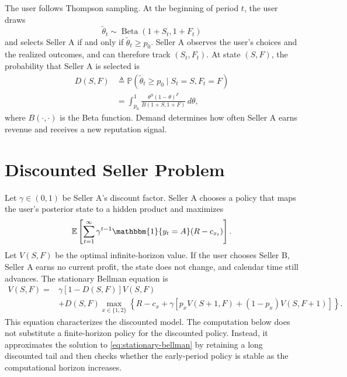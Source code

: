 \documentclass[opre]{informs3}
\newcommand{\E}{\mathbb{E}}
\newcommand{\Pb}{\mathbb{P}}
\newcommand{\Ind}[1]{\mathbbm{1}\{#1\}}
\begin{document}
The user follows Thompson sampling. At the beginning of period $t$, the user
draws
\begin{equation}
    \widetilde{\theta}_t
    \sim
    \operatorname{Beta}(1+S_t,1+F_t)
\end{equation}
and selects Seller A if and only if
$\widetilde{\theta}_t\geq p_0$. Seller A observes the user's choices and the
realized outcomes, and can therefore track $(S_t,F_t)$. At state $(S,F)$, the
probability that Seller A is selected is
\begin{equation}
\begin{aligned}
    D(S,F)
    &\triangleq
    \Pb(\widetilde{\theta}_t\geq p_0\mid S_t=S,F_t=F)\\
    &=
    \int_{p_0}^{1}
    \frac{\theta^S(1-\theta)^F}{B(1+S,1+F)}\,d\theta,
\end{aligned}
\label{eq:demand-probability}
\end{equation}
where $B(\cdot,\cdot)$ is the Beta function. Demand determines how often
Seller A earns revenue and receives a new reputation signal.

\section{Discounted Seller Problem}

Let $\gamma\in(0,1)$ be Seller A's discount factor. Seller A chooses a policy
that maps the user's posterior state to a hidden product and maximizes
\begin{equation}
    \E\left[
        \sum_{t=1}^{\infty}
        \gamma^{t-1}
        \Ind{y_t=A}(R-c_{x_t})
    \right].
    \label{eq:discounted-objective}
\end{equation}
Let $V(S,F)$ be the optimal infinite-horizon value. If the user chooses Seller
B, Seller A earns no current profit, the state does not change, and calendar
time still advances. The stationary Bellman equation is
\begin{equation}
\begin{aligned}
    V(S,F)
    ={}&
    \gamma[1-D(S,F)]V(S,F)\\
    &+
    D(S,F)
    \max_{x\in\{1,2\}}
    \left\{
        R-c_x
        +\gamma\left[
            p_xV(S+1,F)+(1-p_x)V(S,F+1)
        \right]
    \right\}.
\end{aligned}
\label{eq:stationary-bellman}
\end{equation}
This equation characterizes the discounted model. The computation below does
not substitute a finite-horizon policy for the discounted policy. Instead, it
approximates the solution to \cref{eq:stationary-bellman} by retaining a long
discounted tail and then checks whether the early-period policy is stable as
the computational horizon increases.
\end{document}
